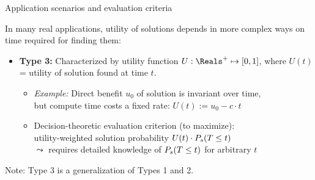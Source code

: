 \begin{frame}[c]{Application scenarios and evaluation criteria}


In many real applications, utility of solutions depends in more complex ways on time required for finding them:

\medskip

\begin{itemize}
\item {\bf Type 3:}
        Characterized by \alert{utility function $U: \Reals^+ \mapsto [0,1]$},
        where $U(t)$ = utility of solution found at time $t$.
        
  \pause
  \bigskip

	\begin{itemize}
 	  \item \emph{Example:} Direct benefit $u_0$ of solution is invariant over time, \\
        but compute time costs a fixed rate: $U(t) := u_0 - c \cdot t$
        
        \pause
        \bigskip

       \item \alert{Decision-theoretic evaluation criterion} (to maximize): \\
                {utility-weighted solution probability} $U(t) \cdot P_s(T \leq t)$       \\
                $\leadsto$ requires detailed knowledge of $P_s(T \leq t)$ for arbitrary $t$
	\end{itemize}
        
\end{itemize}

\pause
\bigskip

{\small{Note: Type 3 is a generalization of Types 1 and 2.}}%


\end{frame}




